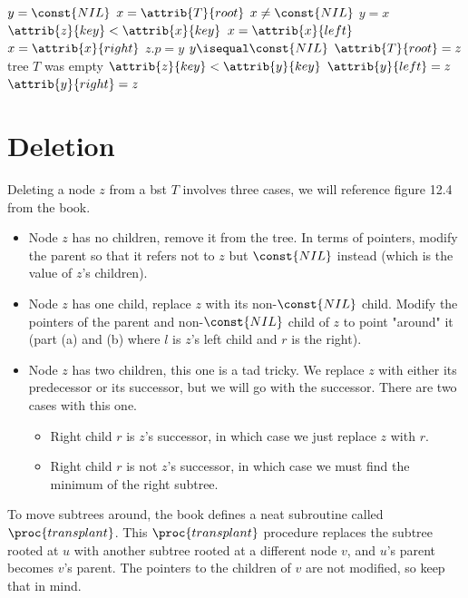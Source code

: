 \documentclass[12pt]{article}
\begin{document}
\begin{codebox}
\li $y = \const{NIL}$
\li $x = \attrib{T}{root}$
\li \While $x \neq \const{NIL}$
    \Do
    \li     $y = x$
        \li \If $\attrib{z}{key} < \attrib{x}{key}$
        \li \Then
                $x = \attrib{x}{left}$
        \li \Else
        \li     $x = \attrib{x}{right}$
            \End
    \End
\li $z.p = y$
\li \If $y \isequal \const{NIL}$
\li \Then
        $\attrib{T}{root} = z$ \Comment tree $T$ was empty
\li \ElseIf $\attrib{z}{key} < \attrib{y}{key}$
\li \Then
        $\attrib{y}{left} = z$
\li \Else
\li     $\attrib{y}{right} = z$
    \End
    
\end{codebox}

\section*{Deletion}
Deleting a node $z$ from a bst $T$ involves three cases, we will reference figure 12.4 from the book.
\begin{itemize}
    \item Node $z$ has no children, remove it from the tree. In terms of pointers, modify the parent so that it refers not to $z$ but $\const{NIL}$ instead (which is the value of $z$'s children).
    \item Node $z$ has one child, replace $z$ with its non-$\const{NIL}$ child. Modify the pointers of the parent and non-$\const{NIL}$ child of $z$ to point "around" it (part (a) and (b) where $l$ is $z$'s left child and $r$ is the right).
    \item Node $z$ has two children, this one is a tad tricky. We replace $z$ with either its predecessor or its successor, but we will go with the successor. There are two cases with this one.
    \begin{itemize}
        \item Right child $r$ is $z$'s successor, in which case we just replace $z$ with $r$.
        \item Right child $r$ is not $z$'s successor, in which case we must find the minimum of the right subtree.
    \end{itemize}
\end{itemize}

\newpage

To move subtrees around, the book defines a neat subroutine called $\proc{transplant}$. This $\proc{transplant}$ procedure replaces the subtree rooted at $u$ with another subtree rooted at a different node $v$, and $u$'s parent becomes $v$'s parent. The pointers to the children of $v$ are not modified, so keep that in mind.
\end{document}
